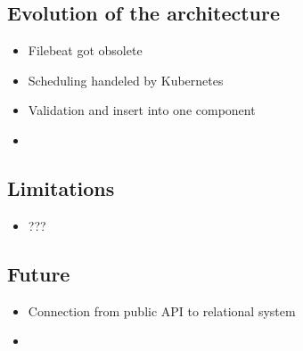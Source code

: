 \subsection{Evolution of the
architecture}\label{evolution-of-the-architecture}

\begin{itemize}
\item
  Filebeat got obsolete
\item
  Scheduling handeled by Kubernetes
\item
  Validation and insert into one component
\item
\end{itemize}

\subsection{Limitations}\label{limitations}

\begin{itemize}
\tightlist
\item
  ???
\end{itemize}

\subsection{Future}\label{future}

\begin{itemize}
\item
  Connection from public API to relational system
\item
\end{itemize}
